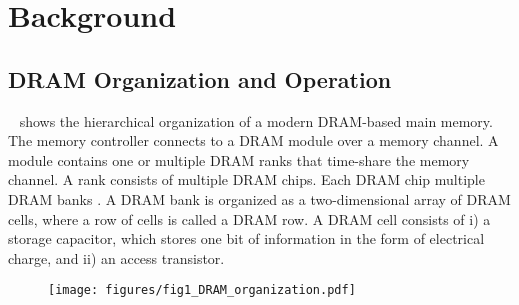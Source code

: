 

\section{Background}
\label{sec:background}
\subsection{DRAM Organization and Operation}
\label{sec:dram_organization}

~ {shows the hierarchical organization of a modern DRAM-based main memory. The memory controller connects to a DRAM module over a memory channel. A module contains one or multiple DRAM ranks that time-share the memory channel. A rank consists of multiple DRAM chips.
Each DRAM chip  multiple DRAM banks . A DRAM bank is organized as a two-dimensional array of DRAM cells, where a row of cells is called a DRAM row. A DRAM cell consists of i) a storage capacitor, which stores one bit of information in the form of electrical charge, and ii) an access transistor.}

\begin{figure}[ht]
    \centering
    \texttt{[image: figures/fig1\_DRAM\_organization.pdf]}
    \caption{}
    \label{fig:dram_organization}
\end{figure}



